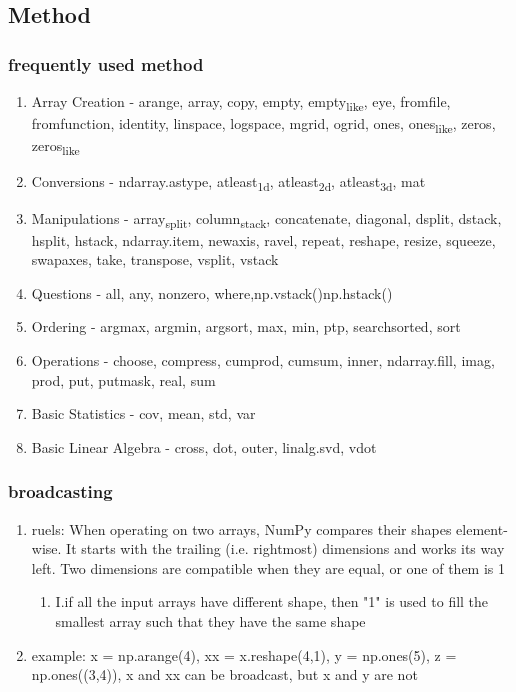 \documentclass[11pt]{article}
\begin{document}
\subsection{Method}
\label{sec:org74d7bb1}
\subsubsection{frequently used method}
\label{sec:orgd923149}
\begin{enumerate}
\item Array Creation - arange, array, copy, empty, empty\textsubscript{like}, eye, fromfile, fromfunction, identity, linspace, logspace, mgrid, ogrid, ones, ones\textsubscript{like}, zeros, zeros\textsubscript{like}
\label{sec:orgbca94fa}
\item Conversions - ndarray.astype, atleast\textsubscript{1d}, atleast\textsubscript{2d}, atleast\textsubscript{3d}, mat
\label{sec:orgec3a860}
\item Manipulations - array\textsubscript{split}, column\textsubscript{stack}, concatenate, diagonal, dsplit, dstack, hsplit, hstack, ndarray.item, newaxis, ravel, repeat, reshape, resize, squeeze, swapaxes, take, transpose, vsplit, vstack
\label{sec:org9963674}
\item Questions - all, any, nonzero, where,np.vstack()np.hstack()
\label{sec:org8ae5aeb}
\item Ordering - argmax, argmin, argsort, max, min, ptp, searchsorted, sort
\label{sec:orgb334bf7}
\item Operations - choose, compress, cumprod, cumsum, inner, ndarray.fill, imag, prod, put, putmask, real, sum
\label{sec:org6c94ef5}
\item Basic Statistics - cov, mean, std, var
\label{sec:orgb88628e}
\item Basic Linear Algebra - cross, dot, outer, linalg.svd, vdot
\label{sec:org05c2e65}
\end{enumerate}
\subsubsection{broadcasting}
\label{sec:org0d11d3c}
\begin{enumerate}
\item ruels: When operating on two arrays, NumPy compares their shapes element-wise. It starts with the trailing (i.e. rightmost) dimensions and works its way left. Two dimensions are compatible when they are equal, or one of them is 1
\label{sec:org1a0cbd8}
\begin{enumerate}
\item I.if all the input arrays have different shape, then "1" is used to fill the smallest array such that they have the same shape
\label{sec:org74fb1dd}
\end{enumerate}
\item example: x = np.arange(4), xx = x.reshape(4,1), y = np.ones(5), z = np.ones((3,4)), x and xx can be broadcast, but x and y are not
\label{sec:orgc1951da}
\end{enumerate}
\end{document}
